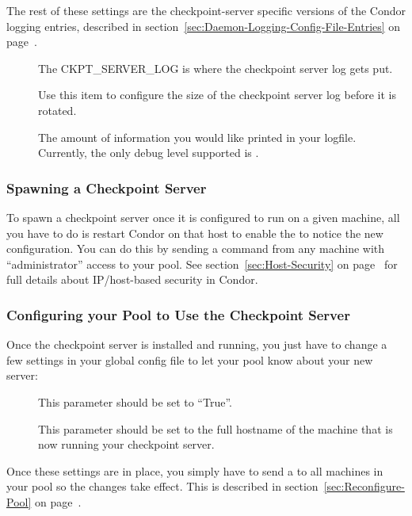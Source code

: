 The rest of these settings are the checkpoint-server specific versions
of the Condor logging entries, described in
section~\ref{sec:Daemon-Logging-Config-File-Entries} on
page~\pageref{sec:Daemon-Logging-Config-File-Entries}.
\begin{description}

\item[] The CKPT\_SERVER\_LOG is where the
checkpoint server log gets put.

\item[] Use this item to configure the
size of the checkpoint server log before it is rotated.

\item[] The amount of information you would
like printed in your logfile.
Currently, the only debug level supported is .

\end{description}

\subsubsection{\label{sec:Spawn-Ckpt-Server} 
Spawning a Checkpoint Server} 

To spawn a checkpoint server once it is configured to run on a given
machine, all you have to do is restart Condor on that host to enable
the  to notice the new configuration.
You can do this by sending a  command from any machine
with ``administrator'' access to your pool.
See section~\ref{sec:Host-Security} on
page~\pageref{sec:Host-Security} for full details about IP/host-based
security in Condor.

\subsubsection{\label{sec:Configure-Pool-Ckpt-Server} 
Configuring your Pool to Use the Checkpoint Server}

Once the checkpoint server is installed and running, you just have to
change a few settings in your global config file to let your pool know
about your new server:
\begin{description}

\item[] This parameter should be set to
``True''.

\item[] This parameter should be set to
the full hostname of the machine that is now running your checkpoint
server.  

\end{description}

Once these settings are in place, you simply have to send a
 to all machines in your pool so the changes take
effect.
This is described in section~\ref{sec:Reconfigure-Pool} on
page~\pageref{sec:Reconfigure-Pool}.

